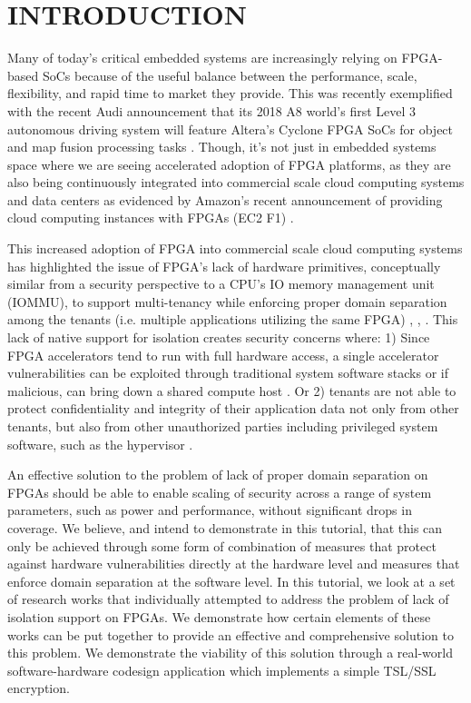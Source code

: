 \documentclass[sigconf]{acmart}
\theoremstyle{plain}
\theoremstyle{remark}
\begin{document}
\maketitle


\section{INTRODUCTION}\label{sec:intro}
Many of today's critical embedded systems are increasingly relying on FPGA-based SoCs because of the useful balance between the performance, scale, flexibility, and rapid time to market they provide. This was recently exemplified with the recent Audi announcement that its 2018 A8 world's first Level 3 autonomous driving system will feature Altera's Cyclone FPGA SoCs for object and map fusion processing tasks \cite{intel}. Though, it's not just in embedded systems space where we are seeing accelerated adoption of FPGA platforms, as they are also being continuously integrated into commercial scale cloud computing systems and data centers as evidenced by Amazon's recent announcement of providing cloud computing instances with FPGAs (EC2 F1) \cite{amazon}.

This increased adoption of FPGA into commercial scale cloud computing systems has highlighted the issue of FPGA's lack of hardware primitives, conceptually similar from a security perspective to a CPU's IO memory management unit (IOMMU), to support multi-tenancy while enforcing proper domain separation among the tenants (i.e. multiple applications utilizing the same FPGA) \cite{CloudFPGA}, \cite{CapslHOST}, \cite{Byma2014FPGAsIT}. This lack of native support for isolation creates security concerns where: 1) Since FPGA accelerators tend to run with full hardware access, a single accelerator vulnerabilities can be exploited through traditional system software stacks or if malicious, can bring down a shared compute host \cite{CloudFPGA}. Or 2) tenants are not able to protect confidentiality and integrity of their application  data not only from other tenants, but also from other unauthorized parties including privileged system software, such as the hypervisor \cite{sconee}.

An effective solution to the problem of lack of proper domain separation on FPGAs should be able to enable scaling of security across a range of system parameters, such as power and performance, without significant drops in coverage. We believe, and intend to demonstrate in this tutorial, that this can only be achieved through some form of combination of measures that protect against hardware vulnerabilities directly at the hardware level and measures that enforce domain separation at the software level. In this tutorial, we look at a set of  research works that individually attempted to address the problem of lack of isolation support on FPGAs. We demonstrate how certain elements of these works can be put together to provide an effective and comprehensive solution to this problem. We demonstrate the viability of this solution through a real-world software-hardware codesign application which implements a simple TSL/SSL encryption.
\end{document}
